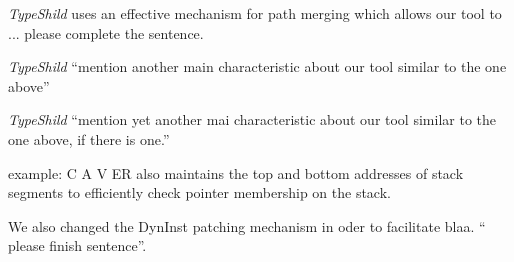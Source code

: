 \textit{TypeShild} uses an effective mechanism for path merging which allows
our tool to ... please complete the sentence.

\textit{TypeShild} ``mention another main characteristic about our tool similar to the one above''

\textit{TypeShild} ``mention yet another mai characteristic about our tool similar to the one above, if there is one.''

example: C A V ER also maintains the
top and bottom addresses of stack segments to efficiently
check pointer membership on the stack. 

We also changed the DynInst patching mechanism in oder to facilitate blaa. `` please finish sentence''.


